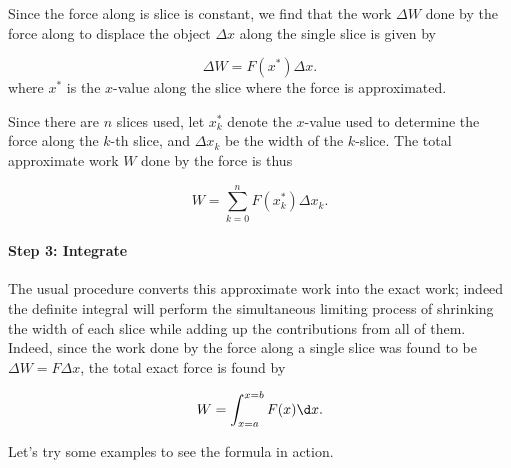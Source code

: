 \documentclass{ximera}
\begin{document}
\begin{model}
\begin{multipleChoice}
\end{multipleChoice}

Since the force along is slice is constant, we find that the work $\Delta W$ done by the force along to displace the object $\Delta x$ along the single slice is given by 

\[
\Delta W = F(x^*) \Delta x.
\]
where $x^*$ is the $x$-value along the slice where the force is approximated.

Since there are $n$ slices used, let $x^*_k$ denote the $x$-value used to determine the force along the $k$-th slice, and $\Delta x_k$ be the width of the $k$-slice.  The total approximate work $W$ done by the force is thus

\[
W = \sum_{k=0}^n F(x_k^*) \Delta x_k.
\]

\paragraph{Step 3: Integrate}  The usual procedure converts this approximate work into the exact work; indeed the definite integral will perform the simultaneous limiting process of shrinking the width of each slice while adding up the contributions from all of them.  Indeed, since the work done by the force along a single slice was found to be $\Delta W =F \Delta x$, the total exact force is found by

\[
W = \int_{x=a}^{x=b} F(x)  \d x.
\]

\end{model}



Let's try some examples to see the formula in action.
\end{document}
